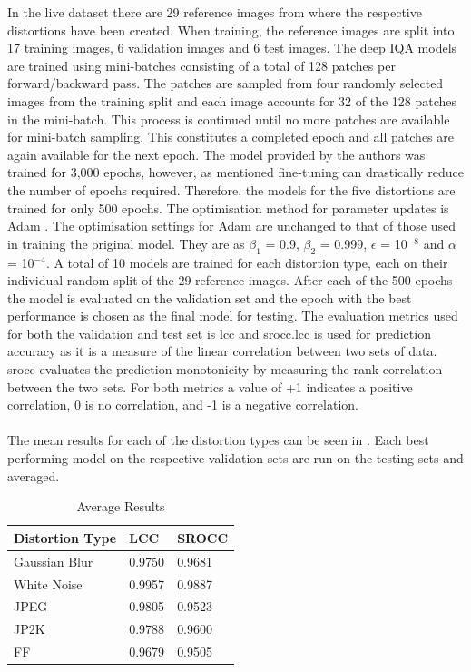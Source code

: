 In the \gls{live} dataset there are 29 reference images from where the respective distortions have been created. When training, the reference images are split into 17 training images, 6 validation images and 6 test images. The deep IQA models are trained using mini-batches consisting of a total of 128 patches per forward/backward pass. The patches are sampled from four randomly selected images from the training split and each image accounts for 32 of the 128 patches in the mini-batch. This process is continued until no more patches are available for mini-batch sampling. This constitutes a completed epoch and all patches are again available for the next epoch. The model provided by the authors was trained for 3,000 epochs, however, as mentioned fine-tuning can drastically reduce the number of epochs required. Therefore, the models for the five distortions are trained for only 500 epochs. The optimisation method for parameter updates is Adam \cite{adam} . The optimisation settings for Adam are unchanged to that of those used in training the original model. They are as $\beta_1$ = 0.9, $\beta_2$ = 0.999, $\epsilon$ = 10$^{-8}$ and $\alpha$ = 10$^{-4}$. A total of 10 models are trained for each distortion type, each on their individual random split of the 29 reference images. After each of the 500 epochs the model is evaluated on the validation set and the epoch with the best performance is chosen as the final model for testing. The evaluation metrics used for both the validation and test set is \gls{lcc} and \gls{srocc}.\gls{lcc} is used for prediction accuracy as it is a measure of the linear correlation between two sets of data. \gls{srocc} evaluates the prediction monotonicity by measuring the rank correlation between the two sets. For both metrics a value of +1 indicates a positive correlation, 0 is no correlation, and -1 is a negative correlation.
\\\\
The mean results for each of the distortion types can be seen in . Each best performing model on the respective validation sets are run on the testing sets and averaged. 

\begin{table}[h]
\centering
\caption{Average Results}
\label{tab:iqaavg}
\begin{tabular}{|l|l|l|}
\hline
Distortion Type & LCC    & SROCC  \\ \hline
Gaussian Blur   & 0.9750 & 0.9681 \\ \hline
White Noise     & 0.9957 & 0.9887 \\ \hline
JPEG            & 0.9805 & 0.9523 \\ \hline
JP2K            & 0.9788 & 0.9600 \\ \hline
FF     & 0.9679 & 0.9505 \\ \hline
\end{tabular}
\end{table}


